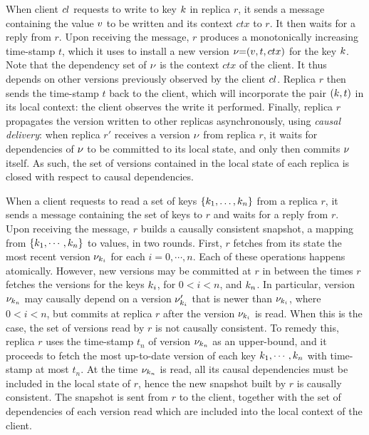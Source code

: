 When client ${cl}$ requests to write to key $k$ in replica $r$, it
sends a message containing the value $v$ to be written and its
context $ctx$ to $r$. It then waits for a reply from $r$. 
Upon receiving the message, $r$ produces a monotonically increasing time-stamp $t$, which it uses to install a new version $\nu {=} (v, t, ctx)$ for the key $k$. 
Note that the dependency set of $\nu$ is the context $ctx$ of the client.
It thus  depends on other versions previously observed by the client ${cl}$. 
Replica $r$ then sends the time-stamp $t$ back to the client, which will incorporate the pair $(k, t)$ in its local context: 
the client observes the write it performed. Finally, replica $r$ propagates the version written to other replicas asynchronously, 
using \emph{causal delivery}: when replica $r'$ receives a version $\nu$ from replica $r$, it 
waits for dependencies of $\nu$ to be committed to its local state, and only then commits $\nu$ itself.
As such, the set of versions contained in the local state of each replica is closed with respect to causal dependencies.

When a client requests to read a set of keys \( \{k_1, \dots,
k_n\} \) from a  replica $r$, it sends a message 
containing the set of keys to $r$ and waits for a reply from $r$. Upon receiving the message, $r$ builds a causally consistent snapshot, \ie
a mapping from $\{k_{1},\cdots, k_{n}\}$ to values, in two rounds. 
First, $r$ fetches from its state 
the most recent version \( \nu_{k_i} \) for each $i
{=} 0,\cdots,n$. Each of these operations happens atomically. However, 
new versions may be committed at $r$ in between the times $r$ fetches the versions for the keys 
$k_{i}$, for $0 < i < n$,  and $k_{n}$. In particular, version $\nu_{k_{n}}$ may causally depend
on a version $\nu'_{k_{i}}$ that is newer than $\nu_{k_{i}}$,  where $0 < i < n$, but commits at replica $r$ 
after the version $\nu_{k_{i}}$ is read. When this is the case, the set of versions read by $r$ is not causally consistent. 
To remedy this, replica $r$ uses the time-stamp $t_{n}$ of version $\nu_{k_{n}}$ as an upper-bound, 
and it proceeds to fetch the most up-to-date version of each key $k_{1}, \cdots, k_{n}$ with time-stamp 
at most $t_{n}$. At the time $\nu_{k_{n}}$ is read,  all its causal dependencies must be included in the local 
state of $r$, hence the new snapshot built by $r$ is causally consistent. The snapshot is sent  from $r$ 
to the client, together with the set of dependencies of each version
read which are 
included into the local context of the client.

